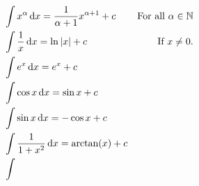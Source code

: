 \begin{theorem}
    \begin{align}
        & \int x^\alpha \mathop{}\!\mathrm{d} x = \frac{1}{\alpha + 1}x^{\alpha + 1} + c & \text{For all \(\alpha \in \mathbb{N}\)} \label{thm:ii:pow}\\
        & \int \frac{1}{x} \mathop{}\!\mathrm{d} x = \ln |x| + c & \text{If \(x \neq 0\).} \\
        & \int e^x \mathop{}\!\mathrm{d} x = e^x + c & \\
        & \int \cos x \mathop{}\!\mathrm{d} x = \sin x + c& \\
        & \int \sin x \mathop{}\!\mathrm{d} x = -\cos x + c& \\
        & \int \frac{1}{1 + x^2} \mathop{}\!\mathrm{d} x = \arctan(x) + c & \\
        & \int 
    \end{align}
\end{theorem}

